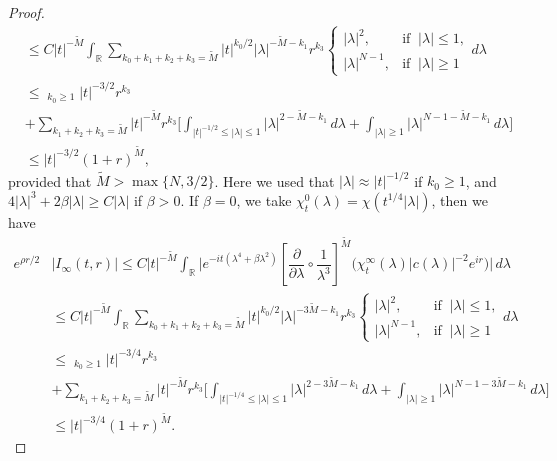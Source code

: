 \documentclass[10pt,leqno]{amsart}
\numberwithin{equation}{section}
\newcommand{\field}[1]{\mathbb{#1}}
\newcommand{\R}{\field{R}}          		%
\begin{document}
\begin{proof}
\begin{align*}
&\leq C |t|^{-\tilde{M}} \int_{\R} \sum_{k_0 +k_1+ k_2 +k_3=\tilde{M}} |t|^{k_0 /2} |\lambda|^{-\tilde{M}-k_1}  r^{k_3} \begin{cases} |\lambda|^{2},&\mbox{if }\ |\lambda|\leq 1,\\ |\lambda|^{N-1},&\mbox{if }\ |\lambda|\geq 1  \end{cases} d\lambda \\
&\leq  \mathop{\sum_{k_0 +k_1+ k_2 +k_3=\tilde{M}}}_{k_0\ge 1}
|t|^{-3 /2}  r^{k_3}\\
&+ \sum_{k_1+ k_2 +k_3=\tilde{M}}  |t|^{-\tilde{M}} r^{k_3} \Big[\int_{|t|^{-1/2}\leq |\lambda|\leq 1} |\lambda|^{2-\tilde{M}-k_1}\, d\lambda +\int_{|\lambda|\geq 1} |\lambda|^{N-1 -\tilde{M}-k_1}\,d\lambda \Big]\\
&\leq |t|^{-3/2} (1+r)^{\tilde{M}},
\end{align*}
provided that $\tilde{M}>\max \{N, 3/2\}$. Here we used that 
$|\lambda|\approx |t|^{-1/2}$ if $k_0 \geq 1$, and $4|\lambda|^3 + 2\beta|\lambda| \geq C |\lambda| $ if $\beta>0$. If $\beta=0$, we take $\chi_t^0 (\lambda) = \chi (t^{1/4} |\lambda|)$, then we have
\begin{align*}
e^{\rho r/2}&|I_\infty (t,r)| \leq C |t|^{-\tilde{M}} \int_{\R} \Big|e^{-it (\lambda^4 +\beta\lambda^2 )}  \left[ \dfrac{\partial}{\partial \lambda} \circ \dfrac{1}{\lambda^3}\right]^{\tilde{M}} \big(\chi_t^\infty (\lambda ) |c(\lambda)|^{-2} e^{ir}\big)\Big|\, d\lambda\\
&\leq C |t|^{-\tilde{M}} \int_{\R} \sum_{k_0 +k_1+ k_2 +k_3=\tilde{M}} |t|^{k_0 /2} |\lambda|^{-3 \tilde{M}-k_1  }  r^{k_3} \begin{cases} |\lambda|^{2},&\mbox{if }\ |\lambda|\leq 1,\\  |\lambda|^{N-1},&\mbox{if }\ |\lambda|\geq 1  \end{cases} d\lambda \\
&\leq \mathop{\sum_{k_0 +k_1+ k_2 +k_3=\tilde{M}}}_{k_0\ge 1}
|t|^{-3 /4}  r^{k_3}\\
&+ \sum_{k_1+ k_2 +k_3=\tilde{M}}  |t|^{-\tilde{M}} r^{k_3} \Big[\int_{|t|^{-1/4}\leq |\lambda|\leq 1} |\lambda|^{2-3\tilde{M}-k_1}\, d\lambda +\int_{|\lambda|\geq 1} |\lambda|^{N-1 -3\tilde{M}-k_1}\,d\lambda \Big]\\
&\leq |t|^{-3/4} (1+r)^{\tilde{M}}.
\end{align*}







\end{proof}
\end{document}

